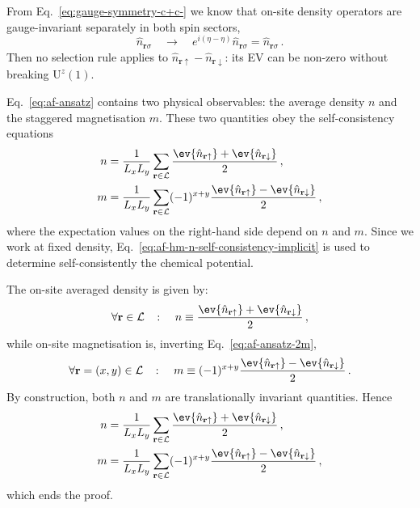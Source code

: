\begin{tabproof}
	
	From Eq.~\eqref{eq:gauge-symmetry-c+c-} we know that on-site density operators are gauge-invariant separately in both spin sectors,
	\[
	\hat n_{\mathbf{r}\sigma}
	\quad\to\quad
	e^{i(\eta - \eta)} \hat n_{\mathbf{r}\sigma} = \hat n_{\mathbf{r}\sigma} \, .
	\]
	Then no selection rule applies to $\hat n_{\mathbf{r}\uparrow} - \hat n_{\mathbf{r}\downarrow}$: its EV can be non-zero without breaking $\mathrm{U}^z(1)$.
\end{tabproof}

Eq.~\eqref{eq:af-ansatz} contains two physical observables: the average density $n$ and the staggered magnetisation $m$. These two quantities obey the self-consistency equations
\begin{align}
	n &= \frac{1}{L_x L_y} \sum_{\mathbf{r}\in\mathcal{L}} \frac{\ev{\hat n_{\mathbf{r}\uparrow}} + \ev{\hat n_{\mathbf{r}\downarrow}}}{2} \, , \label{eq:af-hm-n-self-consistency-implicit}\\
	m &= \frac{1}{L_x L_y} \sum_{\mathbf{r}\in\mathcal{L}} (-1)^{x+y} \frac{\ev{\hat n_{\mathbf{r}\uparrow}} - \ev{\hat n_{\mathbf{r}\downarrow}}}{2} \, , \label{eq:af-hm-m-self-consistency-implicit}
\end{align}
where the expectation values on the right-hand side depend on $n$ and $m$. Since we work at fixed density, Eq.~\eqref{eq:af-hm-n-self-consistency-implicit} is used to determine self-consistently the chemical potential.

\begin{tabproof}
	
	The on-site averaged density is given by:
	\begin{equation}\label{eq:af-n-def}
		\forall \mathbf{r} \in \mathcal{L}
		\quad\colon\quad 
		n \equiv \frac{\ev{\hat n_{\mathbf{r}\uparrow}} + \ev{\hat n_{\mathbf{r}\downarrow}}}{2} \, ,
	\end{equation}
	while on-site magnetisation is, inverting Eq.~\eqref{eq:af-ansatz-2m},
	\begin{equation}\label{eq:af-m-def}
		\forall \mathbf{r} = (x,y) \in \mathcal{L}
		\quad\colon\quad 
		m \equiv (-1)^{x+y} \frac{\ev{\hat n_{\mathbf{r}\uparrow}} - \ev{\hat n_{\mathbf{r}\downarrow}}}{2} \, .
	\end{equation}		
	By construction, both $n$ and $m$ are translationally invariant quantities. Hence
	\[
	\begin{aligned}
		n &= \frac{1}{L_x L_y} \sum_{\mathbf{r}\in\mathcal{L}} \frac{\ev{\hat n_{\mathbf{r}\uparrow}} + \ev{\hat n_{\mathbf{r}\downarrow}}}{2} \, , \\
		m &= \frac{1}{L_x L_y} \sum_{\mathbf{r}\in\mathcal{L}} (-1)^{x+y} \frac{\ev{\hat n_{\mathbf{r}\uparrow}} - \ev{\hat n_{\mathbf{r}\downarrow}}}{2} \, ,
	\end{aligned}
	\]
	which ends the proof.
\end{tabproof}

